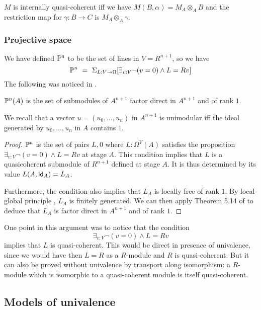 \begin{proposition}
  $M$ is internally quasi-coherent iff we have $M(B,\alpha) = M_A\otimes_A B$ and the restriction map for
  $\gamma:B\rightarrow C$ is $M_A\otimes_A\gamma$.
\end{proposition}

    \subsubsection{Projective space}

We have defined $\mathbb{P}^n$ to be the set of lines in $V = R^{n+1}$, so we have
$$
\mathbb{P}^n ~=~ \Sigma_{L:V\rightarrow \Omega}[\exists_{v:V}\neg (v = 0)\wedge L = R v]
$$
The following was noticed in \cite{kockreyes}.

\begin{proposition}
  $\mathbb{P}^n(A)$ is the set of submodules of $A^{n+1}$ factor direct in $A^{n+1}$ and of rank $1$.
\end{proposition}

We recall \cite{lombardi-quitte}
that a vector $u = (u_0,\dots,u_n)$ in $A^{n+1}$ is unimodular iff the ideal generated by $u_0,\dots,u_n$ in $A$ contains $1$.

\begin{proof}
  $\mathbb{P}^n$ is the set of pairs $L,0$ where $L:\Omega^V(A)$ satisfies the proposition $\exists_{v:V}\neg (v = 0)\wedge L = Rv$ at stage
  $A$. This condition implies that $L$ is a quasicoherent submodule of $R^{n+1}$ defined at stage $A$.
  It is thus determined by its value $L(A,\mathsf{id}_A) = L_A$.

  Furthermore, the condition also implies that $L_A$ is locally free of rank $1$. By local-global principle \cite{lombardi-quitte},
  $L_A$ is finitely generated. We can then apply Theorem 5.14 of
  \cite{lombardi-quitte} to deduce that $L_A$ is factor direct in $A^{n+1}$ and of rank $1$.
\end{proof}

One point in this argument was to notice that the condition
$$
\exists_{v:V}\neg (v = 0)\wedge L = R v
$$
implies that $L$ is quasi-coherent. This would be direct in presence of univalence, since we would have then $L = R$ as a $R$-module
and $R$ is quasi-coherent. But it can also be proved without univalence by transport along isomorphism: a $R$-module which is
isomorphic to a quasi-coherent module is itself quasi-coherent.

\subsection{Models of univalence}

